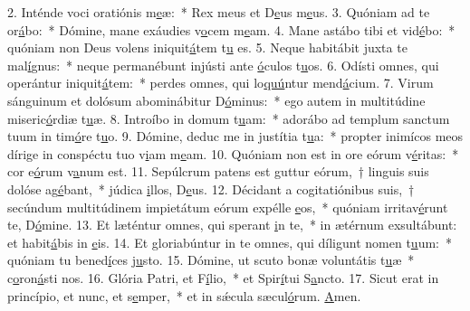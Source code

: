 2. Inténde voci oratiónis m\uline{e}æ:~* Rex meus et D\uline{e}us m\uline{e}us.
3. Quóniam ad te or\uline{á}bo:~* Dómine, mane exáudies v\uline{o}cem m\uline{e}am.
4. Mane astábo tibi et vid\uline{é}bo:~* quóniam non Deus volens iniquit\uline{á}tem t\uline{u} es.
5. Neque habitábit juxta te mal\uline{í}gnus:~* neque permanébunt injústi ante \uline{ó}culos t\uline{u}os.
6. Odísti omnes, qui operántur iniquit\uline{á}tem:~* perdes omnes, qui lo\uline{quú}ntur mend\uline{á}cium.
7. Virum sánguinum et dolósum abominábitur D\uline{ó}minus:~* ego autem in multitúdine miseric\uline{ó}rdiæ t\uline{u}æ.
8. Introíbo in domum t\uline{u}am:~* adorábo ad templum sanctum tuum in tim\uline{ó}re t\uline{u}o.
9. Dómine, deduc me in justítia t\uline{u}a:~* propter inimícos meos dírige in conspéctu tuo v\uline{i}am m\uline{e}am.
10. Quóniam non est in ore eórum v\uline{é}ritas:~* cor e\uline{ó}rum v\uline{a}num est.
11. Sepúlcrum patens est guttur eórum,~† linguis suis dolóse ag\uline{é}bant,~* júdica \uline{i}llos, D\uline{e}us.
12. Décidant a cogitatiónibus suis,~† secúndum multitúdinem impietátum eórum expélle \uline{e}os,~* quóniam irritav\uline{é}runt te, D\uline{ó}mine.
13. Et læténtur omnes, qui sperant \uline{i}n te,~* in ætérnum exsultábunt: et habit\uline{á}bis in \uline{e}is.
14. Et gloriabúntur in te omnes, qui díligunt nomen t\uline{u}um:~* quóniam tu bened\uline{í}ces j\uline{u}sto.
15. Dómine, ut scuto bonæ voluntátis t\uline{u}æ~* c\uline{o}ron\uline{á}sti nos.
16. Glória Patri, et F\uline{í}lio,~* et Spir\uline{í}tui S\uline{a}ncto.
17. Sicut erat in princípio, et nunc, et s\uline{e}mper,~* et in sǽcula sæcul\uline{ó}rum. \uline{A}men.
